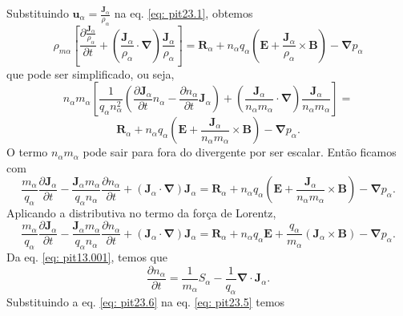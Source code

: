 \documentclass[12pt,oneside,a4paper]{abntex2}
\begin{document}
Substituindo $\bm{u}_\alpha=\frac{\bm{J}_\alpha}{\rho_\alpha}$ na  eq. \ref{eq: pit23.1}, obtemos
\begin{equation}
\label{eq: pit23.2}
\rho_{m\alpha} \left[\frac{\partial \frac{\bm{J}_\alpha}{\rho_\alpha}}{\partial t} + (\frac{\bm{J}_\alpha}{\rho_\alpha} \cdot \bm{\nabla})\frac{\bm{J}_\alpha}{\rho_\alpha} \right] =  \bm{R}_\alpha+n_\alpha q_\alpha (\bm{E} + \frac{\bm{J}_\alpha}{\rho_\alpha} \times \bm{B}) -\bm{\nabla} p_\alpha
\end{equation}
que pode ser simplificado, ou seja,
\begin{equation}
\label{eq: pit23.3}
n_\alpha m_\alpha \left[\frac{1}{q_\alpha n^2_\alpha} \left( \frac{\partial \bm{J}_\alpha}{\partial t} n_\alpha-\frac{\partial n_\alpha}{\partial t} \bm{J}_\alpha\right) + (\frac{\bm{J}_\alpha}{n_\alpha m_\alpha} \cdot \bm{\nabla})\frac{\bm{J}_\alpha}{n_\alpha m_\alpha} \right] =  
\end{equation}
\begin{equation*}
\bm{R}_\alpha+n_\alpha q_\alpha (\bm{E} + \frac{\bm{J}_\alpha}{n_\alpha m_\alpha} \times \bm{B}) -\bm{\nabla} p_\alpha.
\end{equation*}
O termo $n_\alpha m_\alpha$ pode sair para fora do divergente por ser escalar. Então ficamos com
\begin{equation}
\label{eq: pit23.4}
\frac{m_\alpha}{q_\alpha} \frac{\partial \bm{J}_\alpha}{\partial t} -\frac{\bm{J}_\alpha m_\alpha}{q_\alpha n_\alpha} \frac{\partial n_\alpha}{\partial t}  + (\bm{J}_\alpha \cdot \bm{\nabla})\bm{J}_\alpha =  \bm{R}_\alpha+n_\alpha q_\alpha (\bm{E} + \frac{\bm{J}_\alpha}{n_\alpha m_\alpha} \times \bm{B}) -\bm{\nabla} p_\alpha.
\end{equation}
Aplicando a distributiva no termo da força de Lorentz,
\begin{equation}
\label{eq: pit23.5}
\frac{m_\alpha}{q_\alpha} \frac{\partial \bm{J}_\alpha}{\partial t} -\frac{\bm{J}_\alpha m_\alpha}{q_\alpha n_\alpha} \frac{\partial n_\alpha}{\partial t}  + (\bm{J}_\alpha \cdot \bm{\nabla})\bm{J}_\alpha = \bm{R}_\alpha+n_\alpha q_\alpha \bm{E} + \frac{q_\alpha}{m_\alpha} (\bm{J}_\alpha \times \bm{B}) -\bm{\nabla} p_\alpha.
\end{equation}
Da eq. \ref{eq: pit13.001}, temos que
\begin{equation}
\label{eq: pit23.6}
\frac{\partial n_\alpha}{\partial t} = \frac{1}{m_\alpha} S_\alpha -\frac{1}{q_\alpha} \bm{\nabla} \cdot \bm{J}_\alpha.
\end{equation}
Substituindo a eq. \ref{eq: pit23.6} na eq. \ref{eq: pit23.5} temos
\end{document}
